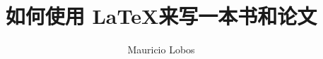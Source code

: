 \documentclass[a4paper]{book}
\begin{document}

\pagestyle{empty}
\title{如何使用 \LaTeX 来写一本书和论文}
\author{Mauricio Lobos}
\date{}
\maketitle

\listoftodos
\tableofcontents

















\end{document}
